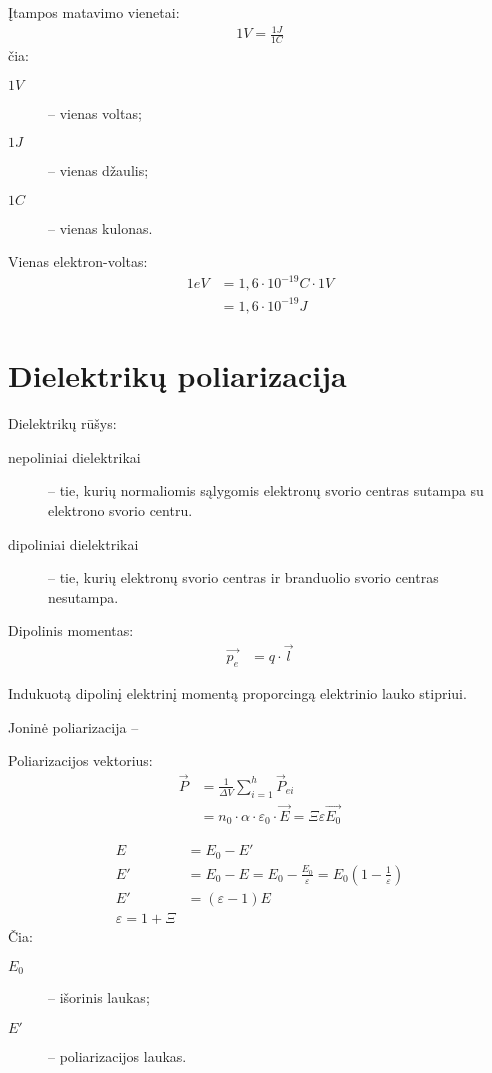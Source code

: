 Įtampos matavimo vienetai:
\begin{align*}
  1 V = \frac{1 J}{1 C}
\end{align*}
čia:
\begin{description}
  \item[$1 V$] – vienas voltas;
  \item[$1 J$] – vienas džaulis;
  \item[$1 C$] – vienas kulonas.
\end{description}

Vienas elektron-voltas:
\begin{align*}
  1 eV
  &= 1,6 \cdot 10^{-19} C \cdot 1 V\\
  &= 1,6 \cdot 10^{-19} J
\end{align*}

\section{Dielektrikų poliarizacija}

Dielektrikų rūšys:
\begin{description}
  \item[nepoliniai dielektrikai] – tie, kurių normaliomis sąlygomis
    elektronų svorio centras sutampa su elektrono svorio centru.
  \item[dipoliniai dielektrikai] – tie, kurių elektronų svorio centras
    ir branduolio svorio centras nesutampa.
\end{description}

Dipolinis momentas:
\begin{align*}
  \vec{p_{e}} &= q \cdot \vec{l}
\end{align*}

Indukuotą dipolinį elektrinį momentą proporcingą elektrinio lauko stipriui.

Joninė poliarizacija – 

Poliarizacijos vektorius:
\begin{align*}
  \vec{P}
  &= \frac{1}{\Delta V} \sum _{i=1} ^{h} \vec{P}_{ei} \\
  &= n_{0} \cdot \alpha \cdot \varepsilon_{0} \cdot \vec{E} =
    \Xi \varepsilon \vec{E_{0}}
\end{align*}

\begin{align*}
  E &= E_{0} - E' \\
  E' &= E_{0} - E = E_{0} - \frac{E_{0}}{\varepsilon} 
  = E_{0} \left( 1 - \frac{1}{\varepsilon} \right) \\
  E' &= (\varepsilon - 1)E \\
  \varepsilon = 1 + \Xi
\end{align*}
Čia:
\begin{description}
  \item[$E_{0}$] – išorinis laukas;
  \item[$E'$] – poliarizacijos laukas.
\end{description}

